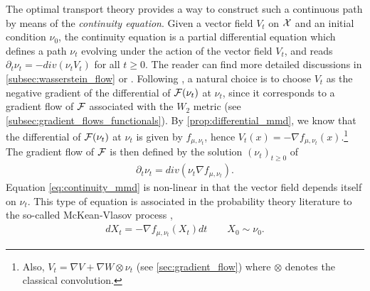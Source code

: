 The optimal transport theory provides a way to construct such a continuous path by means of the \textit{continuity equation}. Given a vector field $V_t$ on ${{\mathcal X}}$ and an initial condition $\nu_0$, the continuity equation is a partial differential equation which defines a path $\nu_t$ evolving under the action of the vector field $V_t$, and reads $\partial_t \nu_t = -div(\nu_t V_t)$ for all $t \geq 0$.
The reader can find more detailed discussions in \cref{subsec:wasserstein_flow} or \cite{Santambrogio:2015}. Following  \cite{ambrosio2008gradient}, a natural choice is to choose $V_t$ as the negative gradient of the differential of ${{\mathcal F}}(\nu_t)$ at $\nu_t$, since it corresponds to a gradient flow of ${{\mathcal F}}$ associated with the $W_2$ metric (see \cref{subsec:gradient_flows_functionals}). %
By \cref{prop:differential_mmd}, we know that the differential of ${{\mathcal F}}(\nu_t)$  at $\nu_t$ is given by $f_{\mu,\nu_t}$, hence $V_t(x) = -\nabla f_{\mu,\nu_t}(x)$.\footnote{Also, $V_t=\nabla V+\nabla W \otimes \nu_t$ (see \cref{sec:gradient_flow}) where $\otimes$ denotes the classical convolution.} The
gradient flow of ${{\mathcal F}}$ is then defined by the solution $(\nu_t)_{t\geq 0}$ of
\begin{align}\label{eq:continuity_mmd}
	\partial_t \nu_t = div(\nu_t \nabla f_{\mu,\nu_t}).
\end{align}
Equation \cref{eq:continuity_mmd} is non-linear in that the vector field depends itself on $\nu_t$. This type of equation is associated in the probability theory literature to the so-called McKean-Vlasov process \cite{kac1956foundations,mckean1966class},
\begin{align}\label{eq:mcKean_Vlasov_process}
	d X_t = -\nabla f_{\mu,\nu_t}(X_t)dt \qquad X_0\sim \nu_0.
\end{align}

